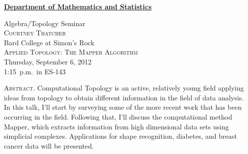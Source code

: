 \documentclass[12pt]{article}
\begin{document}
\noindent\hspace{-28pt}\raisebox{-19pt}{\XeTeXpicfile UAlogo.jpg scaled 340}%
\hfill\textsf{\textbf{\footnotesize\href{http://www.albany.edu/math/}{Department of Mathematics and Statistics}}}\bigskip\bigskip

\begin{center}\Large
  \textsf{\huge Algebra/Topology Seminar}\\[2.5\bigskipamount]
  \textsc{\LARGE Courtney Thatcher}\\
  Bard College at Simon's Rock\\[1.5\bigskipamount]
  \textsc{\LARGE Applied Topology: The Mapper Algorithm}\\[2\bigskipamount]
  Thursday, September 6, 2012\\1:15~p.m.\ in ES-143\\[3\bigskipamount]
\end{center}

\noindent\large\textsc{Abstract.}
Computational Topology is an active, relatively young field applying ideas from topology to obtain different information in the field of data analysis. In this talk, I'll start by surveying some of the more recent work that has been occurring in the field. Following that, I'll discuss the computational method Mapper, which extracts information from high dimensional data sets using simplicial complexes. Applications for shape recognition, diabetes, and breast cancer data will be presented.
\end{document}
